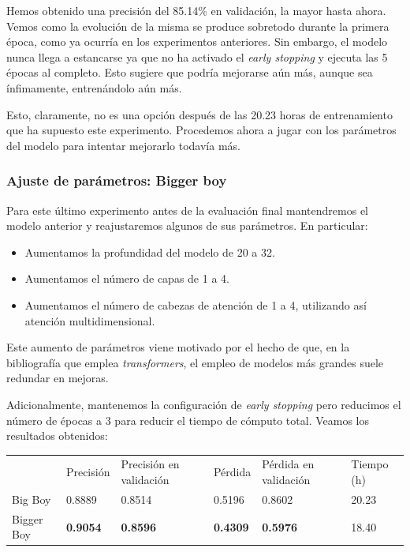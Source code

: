 \documentclass[a4paper, 20pt, dvipsnames]{article}
\begin{document}
Hemos obtenido una precisión del 85.14\% en validación, la mayor hasta ahora. Vemos como la evolución de la misma se produce sobretodo durante la primera época, como ya ocurría en los experimentos anteriores. Sin embargo, el modelo nunca llega a estancarse ya que no ha activado el \emph{early stopping} y ejecuta las 5 épocas al completo. Esto sugiere que podría mejorarse aún más, aunque sea ínfimamente, entrenándolo aún más.

Esto, claramente, no es una opción después de las 20.23 horas de entrenamiento que ha supuesto este experimento. Procedemos ahora a jugar con los parámetros del modelo para intentar mejorarlo todavía más.

\subsubsection{Ajuste de parámetros: Bigger boy}

Para este último experimento antes de la evaluación final mantendremos el modelo
anterior y reajustaremos algunos de sus parámetros. En particular:

\begin{itemize}
\item Aumentamos la profundidad del modelo de 20 a 32.
\item Aumentamos el número de capas de 1 a 4.
\item Aumentamos el número de cabezas de atención de 1 a 4, utilizando así
  atención multidimensional.
\end{itemize}

Este aumento de parámetros viene motivado por el hecho de que, en la
bibliografía que emplea \emph{transformers}, el empleo de modelos más grandes
suele redundar en mejoras.

Adicionalmente, mantenemos la configuración de \emph{early stopping} pero
reducimos el número de épocas a 3 para reducir el tiempo de cómputo
total. Veamos los resultados obtenidos:

\begin{table}[H]
	\centering
	\begin{tabular}{llllll}
		& Precisión & Precisión en validación & Pérdida & Pérdida en validación & Tiempo (h) \\ \cline{2-6} 
		Big Boy    & 0.8889    & 0.8514                  & 0.5196  & 0.8602                & 20.23 \\
		Bigger Boy & \textbf{0.9054}    & \textbf{0.8596}                  & \textbf{0.4309}  & \textbf{0.5976}                & 18.40
	\end{tabular}
\end{table}
\end{document}
